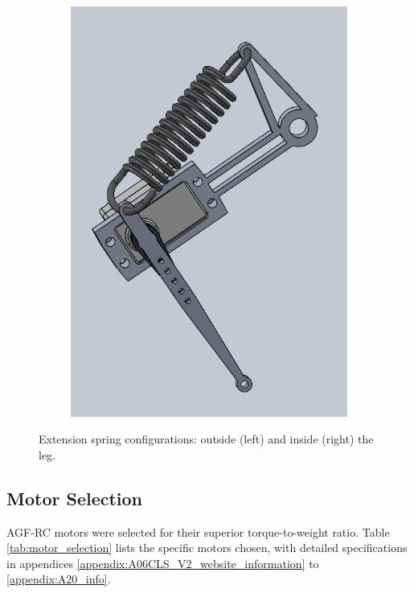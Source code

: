 \begin{figure}[h!]
\begin{subfigure}[b]{0.45\textwidth}
        \includegraphics[width=\textwidth]{Images/extension_spring_inside.png}
        \label{fig:extension_spring_inside}
    \end{subfigure}
    \caption{Extension spring configurations: outside (left) and inside (right) the leg.}
    \label{fig:extension_spring_CAD}
\end{figure}

\subsection{Motor Selection}
\label{sec:motor_selection}

AGF-RC motors were selected for their superior torque-to-weight ratio. Table \ref{tab:motor_selection} lists the specific motors chosen, with detailed specifications in appendices \ref{appendix:A06CLS_V2_website_information} to \ref{appendix:A20_info}.

